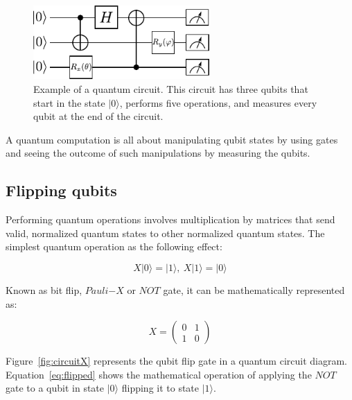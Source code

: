 \begin{figure}[!htbp]
\centering
	\includegraphics[width=0.60\textwidth]{figures/qcircuit.pdf}
\caption{Example of a quantum circuit. This circuit has three qubits that start 
in the state $\vert 0 \rangle$, performs five operations, and measures every 
qubit at the end of the circuit.}
\label{fig:circuit}
\end{figure}

A quantum computation is all about manipulating qubit states by using gates and
seeing the outcome of such manipulations by measuring the qubits.

\subsection{Flipping qubits}
\label{sec:flip}

Performing quantum operations involves multiplication by matrices that send 
valid, normalized quantum states to other normalized quantum states. The 
simplest quantum operation as the following effect:

\begin{linenomath}
\begin{equation}
	X\vert 0 \rangle = \vert 1 \rangle, \
	X\vert 1 \rangle = \vert 0 \rangle
\label{eq:flip}
\end{equation}
\end{linenomath}

Known as bit flip, $Pauli\mathrm{-}X$ or $NOT$ gate, it can be mathematically represented as:

\begin{linenomath}
\begin{equation}
	X = \begin{pmatrix}
	0 & 1 \\
	1 & 0
	\end{pmatrix}
\label{eq:flipX}
\end{equation}
\end{linenomath}

Figure~\ref{fig:circuitX} represents the qubit flip gate in a quantum circuit 
diagram.
Equation~\ref{eq:flipped} shows the mathematical operation of applying the $NOT$
gate to a qubit in state $\vert 0 \rangle$ flipping it to state $\vert 1 \rangle$.

